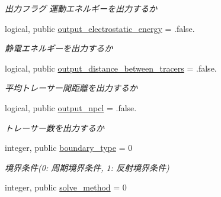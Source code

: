 \begin{DoxyCompactItemize}
\begin{DoxyCompactList}\small\item\em 出力フラグ 運動エネルギーを出力するか \end{DoxyCompactList}\item 
\hypertarget{classparameters_a522e40874a433032e8ee52b3e4c2abd3}{logical, public \hyperlink{classparameters_a522e40874a433032e8ee52b3e4c2abd3}{output\-\_\-electrostatic\-\_\-energy} = .false.}\label{classparameters_a522e40874a433032e8ee52b3e4c2abd3}

\begin{DoxyCompactList}\small\item\em 静電エネルギーを出力するか \end{DoxyCompactList}\item 
\hypertarget{classparameters_a7b1033391d1fb60a6d86d63f4694bd60}{logical, public \hyperlink{classparameters_a7b1033391d1fb60a6d86d63f4694bd60}{output\-\_\-distance\-\_\-between\-\_\-tracers} = .false.}\label{classparameters_a7b1033391d1fb60a6d86d63f4694bd60}

\begin{DoxyCompactList}\small\item\em 平均トレーサー間距離を出力するか \end{DoxyCompactList}\item 
\hypertarget{classparameters_adb9d01d9b0b50a47f2b7e32d5de22e53}{logical, public \hyperlink{classparameters_adb9d01d9b0b50a47f2b7e32d5de22e53}{output\-\_\-npcl} = .false.}\label{classparameters_adb9d01d9b0b50a47f2b7e32d5de22e53}

\begin{DoxyCompactList}\small\item\em トレーサー数を出力するか \end{DoxyCompactList}\item 
\hypertarget{classparameters_a106c7a93f18c58f213c610e83f4d6d31}{integer, public \hyperlink{classparameters_a106c7a93f18c58f213c610e83f4d6d31}{boundary\-\_\-type} = 0}\label{classparameters_a106c7a93f18c58f213c610e83f4d6d31}

\begin{DoxyCompactList}\small\item\em 境界条件(0\-: 周期境界条件, 1\-: 反射境界条件) \end{DoxyCompactList}\item 
\hypertarget{classparameters_a122b7c96650d0fac8398400bbae9ccb3}{integer, public \hyperlink{classparameters_a122b7c96650d0fac8398400bbae9ccb3}{solve\-\_\-method} = 0}\label{classparameters_a122b7c96650d0fac8398400bbae9ccb3}


\end{DoxyCompactItemize}
